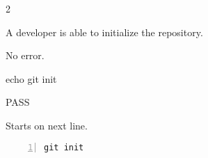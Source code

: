 \begin{description}[align=right,leftmargin=3.2cm,labelindent=3.0cm]
\item[Step:] 2
\item[Confirm:] A developer is able to initialize the repository.
\item[Expectation:] No error.
\item[Command:] echo git  init
\item[Test Result:] PASS
\item[Evidence:] Starts on next line.
\end{description}
\begin{lstlisting}[numbers=left]
git init

\end{lstlisting}
